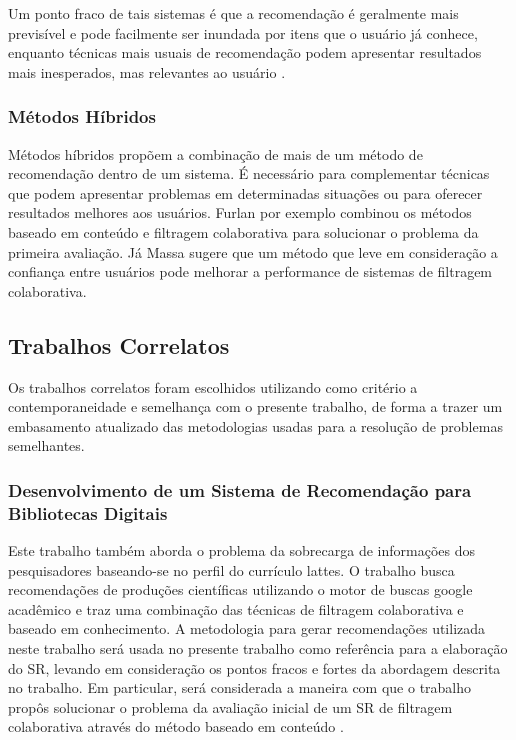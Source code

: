 \documentclass[12pt]{article}
\begin{document}
Um ponto fraco de tais sistemas é que a recomendação é geralmente mais previsível e pode facilmente ser inundada por itens que o 
usuário já conhece, enquanto técnicas mais usuais de recomendação podem apresentar resultados mais inesperados, mas relevantes ao 
usuário \cite{sinha2001comparing}.

\subsubsection{Métodos Híbridos}

Métodos híbridos propõem a combinação de mais de um método de recomendação dentro de um sistema. É necessário para complementar 
técnicas que podem apresentar problemas em determinadas situações ou para oferecer resultados melhores aos usuários. Furlan 
\cite{da2018desenvolvimento} por exemplo combinou os métodos baseado em conteúdo e filtragem colaborativa para solucionar o problema da primeira 
avaliação. Já Massa \cite{massa2004trust} sugere que um método que leve em consideração a confiança entre usuários pode melhorar a 
performance de sistemas de filtragem colaborativa.

\subsection{Trabalhos Correlatos}

Os trabalhos correlatos foram escolhidos utilizando como critério a contemporaneidade e semelhança com o presente trabalho, 
de forma a trazer um embasamento atualizado das metodologias usadas para a resolução de problemas semelhantes.

\subsubsection{Desenvolvimento de um Sistema de Recomendação para Bibliotecas Digitais}

Este trabalho também aborda o problema da sobrecarga de informações dos pesquisadores baseando-se no perfil do currículo lattes. 
O trabalho busca recomendações de produções científicas utilizando o motor de buscas google acadêmico e traz uma combinação 
das técnicas de filtragem colaborativa e baseado em conhecimento. A metodologia para gerar recomendações utilizada neste 
trabalho será usada no presente trabalho como referência para a elaboração do SR, levando em consideração os pontos fracos 
e fortes da abordagem descrita no trabalho. Em particular, será considerada a maneira com que o trabalho propôs solucionar 
o problema  da avaliação inicial de um SR de filtragem colaborativa através do método baseado em conteúdo \cite{da2018desenvolvimento}.
\end{document}
